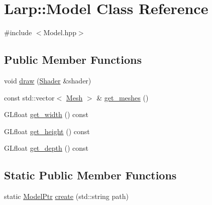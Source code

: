 \hypertarget{classLarp_1_1Model}{}\section{Larp\+:\+:Model Class Reference}
\label{classLarp_1_1Model}


{\ttfamily \#include $<$Model.\+hpp$>$}

\subsection*{Public Member Functions}
\begin{DoxyCompactItemize}
\item 
void \hyperlink{classLarp_1_1Model_a042ea3bc2add2d3bbe4f199d070a9619}{draw} (\hyperlink{classLarp_1_1Shader}{Shader} \&shader)
\item 
const std\+::vector$<$ \hyperlink{classLarp_1_1Mesh}{Mesh} $>$ \& \hyperlink{classLarp_1_1Model_a791e0700312fa2d6b7c66b5df3dfa17e}{get\+\_\+meshes} ()
\item 
G\+Lfloat \hyperlink{classLarp_1_1Model_ac18c6754c106ace09b4ac27cbcc34142}{get\+\_\+width} () const 
\item 
G\+Lfloat \hyperlink{classLarp_1_1Model_ad911ecf99212b052ccc86a5b48b498ec}{get\+\_\+height} () const 
\item 
G\+Lfloat \hyperlink{classLarp_1_1Model_a8ff35b30d2cb87b2bb0d4088feacbd1a}{get\+\_\+depth} () const 
\end{DoxyCompactItemize}
\subsection*{Static Public Member Functions}
\begin{DoxyCompactItemize}
\item 
static \hyperlink{namespaceLarp_a1fbc1dec59f7a571dc06e152b1e7d38c}{Model\+Ptr} \hyperlink{classLarp_1_1Model_ad210cba89de86a6c6ccc71386babe64b}{create} (std\+::string path)
\end{DoxyCompactItemize}
